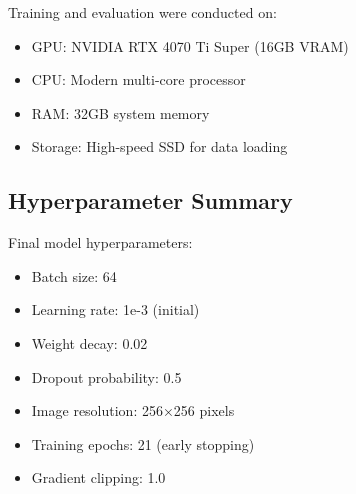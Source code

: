 \documentclass[12pt,twocolumn]{article}
\begin{document}
Training and evaluation were conducted on:
\begin{itemize}
\item GPU: NVIDIA RTX 4070 Ti Super (16GB VRAM)
\item CPU: Modern multi-core processor
\item RAM: 32GB system memory
\item Storage: High-speed SSD for data loading
\end{itemize}

\subsection{Hyperparameter Summary}

Final model hyperparameters:
\begin{itemize}
\item Batch size: 64
\item Learning rate: 1e-3 (initial)
\item Weight decay: 0.02
\item Dropout probability: 0.5
\item Image resolution: 256×256 pixels
\item Training epochs: 21 (early stopping)
\item Gradient clipping: 1.0
\end{itemize}
\end{document}
